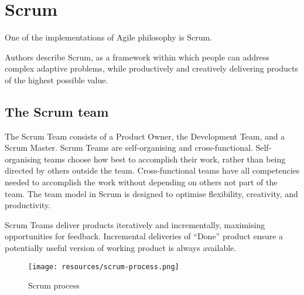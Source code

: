 

\section{Scrum}

One of the implementations of Agile philosophy is Scrum.

Authors describe Scrum, \cite{scrum-guide} as a framework within which people can address complex adaptive problems, while productively and creatively delivering products of the highest possible value.

\subsection{The Scrum team}

The Scrum Team consists of a Product Owner, the Development Team, and a Scrum Master. Scrum Teams are self-organising and cross-functional. Self-organising teams choose how best to accomplish their work, rather than being directed by others outside the team. Cross-functional teams have all competencies needed to accomplish the work without depending on others not part of the team. The team model in Scrum is designed to optimise flexibility, creativity, and productivity.

Scrum Teams deliver products iteratively and incrementally, maximising opportunities for feedback. Incremental deliveries of ``Done'' product ensure a potentially useful version of 
working product is always available.

\begin{figure}
	\centering
	\texttt{[image: resources/scrum-process.png]}
	\caption[Scrum process]{Scrum process}
\end{figure}

